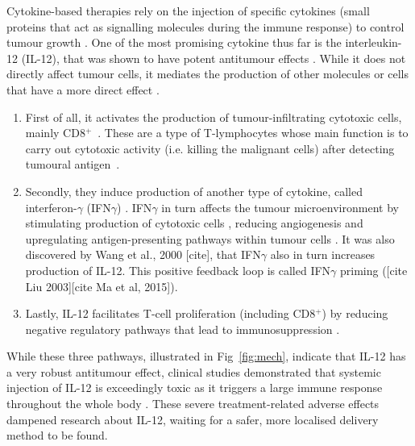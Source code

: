 \documentclass[11pt]{article}
\begin{document}
Cytokine-based therapies rely on the injection of specific cytokines (small proteins that act as signalling molecules during the immune response) to control tumour growth \cite{ioDef}. One of the most promising cytokine thus far is the interleukin-12 (IL-12), that was shown to have potent antitumour effects \cite{il12IsCool}. While it does not directly affect tumour cells, it mediates the production of other molecules or cells that have a more direct effect \cite{il12CytokineStorm}.
\begin{enumerate}
    \item First of all, it activates the production of tumour-infiltrating cytotoxic cells, mainly CD8$^+$~\cite{cd8FirstWay}. These are a type of T-lymphocytes whose main function is to carry out cytotoxic activity (i.e. killing the malignant cells) after detecting tumoural antigen~\cite{cd8Effects}. 
    \item Secondly, they induce production of another type of cytokine, called interferon-$\gamma$ (IFN$\gamma$) \cite{ifnIL12}. IFN$\gamma$ in turn affects the tumour microenvironment by stimulating production of cytotoxic cells \cite{ifngNKProd}, reducing angiogenesis \cite{ifngAngiogenesis} and upregulating antigen-presenting pathways within tumour cells \cite{ifngAntigenExposure}. It was also discovered by Wang et al., 2000 [cite], that IFN$\gamma$ also in turn increases production of IL-12. This positive feedback loop is called IFN$\gamma$ priming ([cite Liu 2003][cite Ma et al, 2015]).
    \item Lastly, IL-12 facilitates T-cell proliferation (including CD8$^+$) by reducing negative regulatory pathways that lead to immunosuppression \cite{reducImmunoSuppression}.
\end{enumerate}
While these three pathways, illustrated in Fig~\ref{fig:mech}, indicate that IL-12 has a very robust antitumour effect, clinical studies demonstrated that systemic injection of IL-12 is exceedingly toxic as it triggers a large immune response throughout the whole body \cite{clintriAC1}\cite{clintriAC2}. These severe treatment-related adverse effects dampened research about IL-12, waiting for a safer, more localised delivery method to be found.
\end{document}
